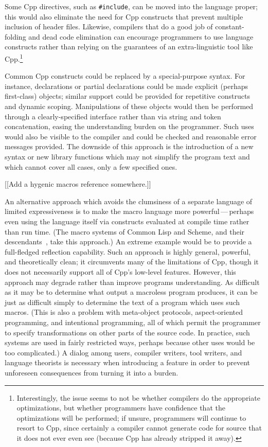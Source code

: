 \documentclass[10pt]{article}
\begin{document}
Some Cpp directives, such as {\tt \#include}, can be moved into the
language proper; this would also eliminate the need for Cpp constructs that
prevent multiple inclusion of header files.  Likewise, compilers that do a
good job of constant-folding and dead code elimination can encourage
programmers to use language constructs rather than relying on the
guarantees of an extra-linguistic tool like Cpp.\footnote{Interestingly,
  the issue seems to not be whether compilers do the appropriate
  optimizations, but whether programmers have confidence that the
  optimizations will be performed; if unsure, programmers will continue to
  resort to Cpp, since certainly a compiler cannot generate code for source
  that it does not ever even see (because Cpp has already stripped it
  away).}

Common Cpp constructs could be replaced by a special-purpose syntax.  For
instance, declarations or partial declarations could be made explicit
(perhaps first-class) objects; similar support could be provided for
repetitive constructs and dynamic scoping.  Manipulations of these objects
would then be performed through a clearly-specified interface rather than
via string and token concatenation, easing the understanding burden on the
programmer.  Such uses would also be visible to the compiler and could be
checked and reasonable error messages provided.  The downside of this
approach is the introduction of a new syntax or new library functions which
may not simplify the program text and which cannot cover all cases, only a
few specified ones.

[[Add a hygenic macros reference somewhere.]]

An alternative approach which avoids the clumsiness of a separate language
of limited expressiveness is to make the macro language more
powerful\,---\,perhaps even using the language itself via constructs
evaluated at compile time rather than run time.  (The macro systems of
Common Lisp and Scheme, and their descendants~\cite{WeiseC93}, take this
approach.)  An extreme example would be to provide a full-fledged
reflection capability.  Such an approach is highly general, powerful, and
theoretically clean; it circumvents many of the limitations of Cpp,
though it does not necessarily support all of Cpp's low-level features.
However, this approach may degrade rather than improve programs
understanding.  As difficult as it may be to determine what output a
macroless program produces, it can be just as difficult simply to determine
the text of a program which uses such macros.  (This is also a problem with
meta-object protocols, aspect-oriented programming, and intentional
programming, all of which permit the programmer to specify transformations
on other parts of the source code.  In practice, such systems are used in
fairly restricted ways, perhaps because other uses would be too
complicated.)  A dialog among users, compiler writers, tool writers, and
language theorists is necessary when introducing a feature in order to
prevent unforeseen consequences from turning it into a burden.
\end{document}
